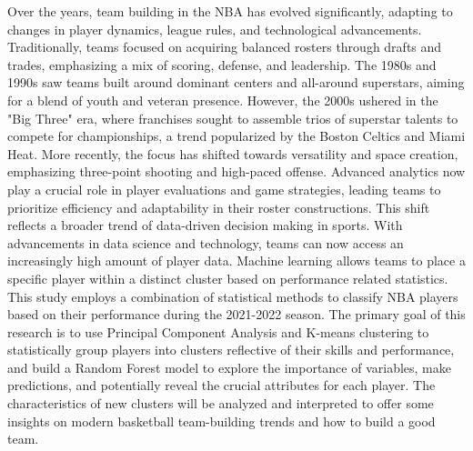 \documentclass[fleqn,10pt]{SelfArx} %
\begin{document}
Over the years, team building in the NBA has evolved significantly, adapting to changes in player dynamics, league rules, and technological advancements. Traditionally, teams focused on acquiring balanced rosters through drafts and trades, emphasizing a mix of scoring, defense, and leadership. The 1980s and 1990s saw teams built around dominant centers and all-around superstars, aiming for a blend of youth and veteran presence. However, the 2000s ushered in the "Big Three" era, where franchises sought to assemble trios of superstar talents to compete for championships, a trend popularized by the Boston Celtics and Miami Heat. More recently, the focus has shifted towards versatility and space creation, emphasizing three-point shooting and high-paced offense. Advanced analytics now play a crucial role in player evaluations and game strategies, leading teams to prioritize efficiency and adaptability in their roster constructions. This shift reflects a broader trend of data-driven decision making in sports. With advancements in data science and technology, teams can now access an increasingly high amount of player data. Machine learning allows teams to place a specific player within a distinct cluster based on performance related statistics. \\
This study employs a combination of statistical methods to classify NBA players based on their performance during the 2021-2022 season. The primary goal of this research is to use Principal Component Analysis and K-means clustering to statistically group players into clusters reflective of their skills and performance, and build a Random Forest model to explore the importance of variables, make predictions, and potentially reveal the crucial attributes for each player. The characteristics of new clusters will be analyzed and interpreted to offer some insights on modern basketball team-building trends and how to build a good team. 



\end{document}
